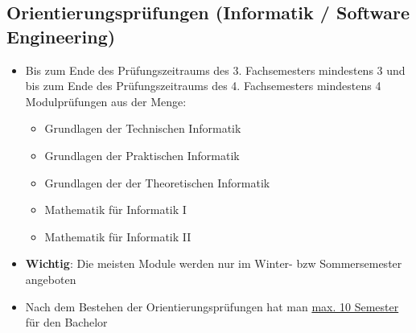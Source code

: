\documentclass[
	aspectratio=169, 
	8pt 
]{beamer}
\begin{document}
\subsection{Orientierungsprüfungen (Informatik / Software Engineering)}
\begin{frame}{\insertsubsection \footnotemark[1]}
    \begin{itemize}
        \item Bis zum Ende des Prüfungszeitraums des 3. Fachsemesters mindestens 3 und bis zum Ende des Prüfungszeitraums des 4. Fachsemesters mindestens 4 Modulprüfungen aus der Menge: \begin{itemize}
        \item Grundlagen der Technischen Informatik
        \item Grundlagen der Praktischen Informatik
        \item Grundlagen der der Theoretischen Informatik
        \item Mathematik für Informatik I
        \item Mathematik für Informatik II \end{itemize}
        \item \textbf{Wichtig}: Die meisten Module werden nur im Winter- bzw Sommersemester angeboten
        \item Nach dem Bestehen der Orientierungsprüfungen hat man \underline{max. 10 Semester} für den Bachelor 
    \end{itemize}

\end{frame}
\end{document}
